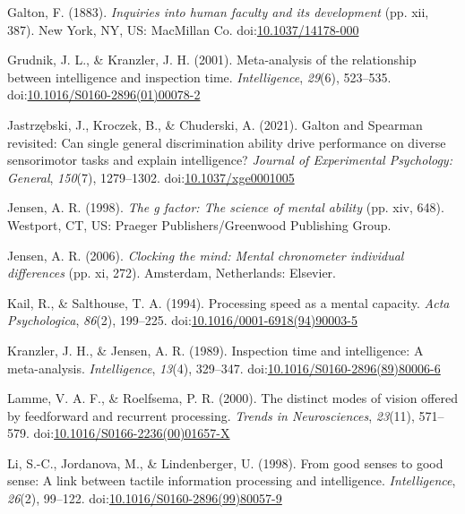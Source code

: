 \documentclass[
  ,man]{apa6}
\newlength{\cslhangindent}
\newenvironment{CSLReferences}[2] %
 {\begin{list}{}{%
  \setlength{\itemindent}{0pt}
  \setlength{\leftmargin}{0pt}
  \setlength{\parsep}{0pt}
  \ifodd #1
   \setlength{\leftmargin}{\cslhangindent}
   \setlength{\itemindent}{-1\cslhangindent}
  \fi
  \setlength{\itemsep}{#2\baselineskip}}}
 {\end{list}}
\begin{document}
\begin{CSLReferences}{1}{0}
Galton, F. (1883). \emph{Inquiries into human faculty and its development} (pp. xii, 387). New York, NY, US: MacMillan Co. doi:\href{https://doi.org/10.1037/14178-000}{10.1037/14178-000}

Grudnik, J. L., \& Kranzler, J. H. (2001). Meta-analysis of the relationship between intelligence and inspection time. \emph{Intelligence}, \emph{29}(6), 523--535. doi:\href{https://doi.org/10.1016/S0160-2896(01)00078-2}{10.1016/S0160-2896(01)00078-2}

Jastrzębski, J., Kroczek, B., \& Chuderski, A. (2021). Galton and {Spearman} revisited: {Can} single general discrimination ability drive performance on diverse sensorimotor tasks and explain intelligence? \emph{Journal of Experimental Psychology: General}, \emph{150}(7), 1279--1302. doi:\href{https://doi.org/10.1037/xge0001005}{10.1037/xge0001005}

Jensen, A. R. (1998). \emph{The g factor: {The} science of mental ability} (pp. xiv, 648). Westport, CT, US: Praeger Publishers/Greenwood Publishing Group.

Jensen, A. R. (2006). \emph{Clocking the mind: {Mental} chronometer individual differences} (pp. xi, 272). Amsterdam, Netherlands: Elsevier.

Kail, R., \& Salthouse, T. A. (1994). Processing speed as a mental capacity. \emph{Acta Psychologica}, \emph{86}(2), 199--225. doi:\href{https://doi.org/10.1016/0001-6918(94)90003-5}{10.1016/0001-6918(94)90003-5}

Kranzler, J. H., \& Jensen, A. R. (1989). Inspection time and intelligence: {A} meta-analysis. \emph{Intelligence}, \emph{13}(4), 329--347. doi:\href{https://doi.org/10.1016/S0160-2896(89)80006-6}{10.1016/S0160-2896(89)80006-6}

Lamme, V. A. F., \& Roelfsema, P. R. (2000). The distinct modes of vision offered by feedforward and recurrent processing. \emph{Trends in Neurosciences}, \emph{23}(11), 571--579. doi:\href{https://doi.org/10.1016/S0166-2236(00)01657-X}{10.1016/S0166-2236(00)01657-X}

Li, S.-C., Jordanova, M., \& Lindenberger, U. (1998). From good senses to good sense: {A} link between tactile information processing and intelligence. \emph{Intelligence}, \emph{26}(2), 99--122. doi:\href{https://doi.org/10.1016/S0160-2896(99)80057-9}{10.1016/S0160-2896(99)80057-9}


\end{CSLReferences}
\end{document}
